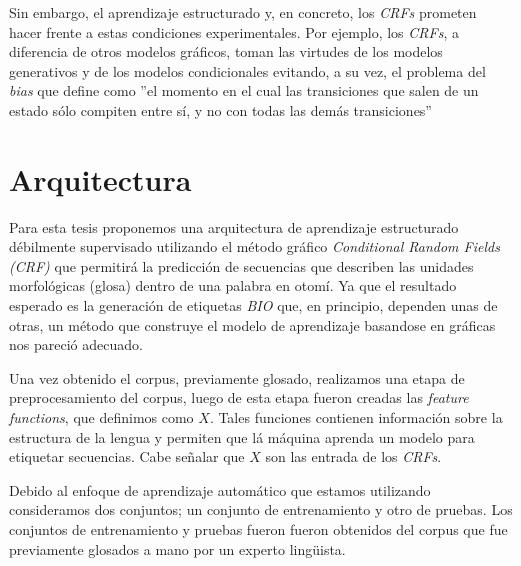 \documentclass[letterpaper,12pt,oneside]{book}
\newcommand{\note}[4][]{\todo[author=#2,color=#3,size=\scriptsize,fancyline,caption={},#1]{#4}} %
\newcommand{\diego}[2][]{\note[#1]{Diego}{blue!40}{#2}}
\newcommand{\Diego}[2][]{\diego[inline,#1]{#2}\noindent}
\theoremstyle{definition}
\begin{document}
Sin  embargo, el aprendizaje estructurado y, en concreto, los \textit{CRFs} prometen hacer frente a estas condiciones experimentales. Por ejemplo, los \textit{CRFs}, a diferencia de otros modelos gráficos, toman las virtudes de los modelos generativos y de los modelos condicionales evitando, a su vez, el problema del \textit{bias} que \citet{lafferty2001conditional} define como  ''el momento en el cual las transiciones que salen de un estado sólo compiten entre sí, y no con todas las demás transiciones'' 

\section{Arquitectura}


Para esta tesis proponemos una arquitectura de aprendizaje estructurado débilmente supervisado utilizando el método gráfico \textit{Conditional Random Fields (CRF)} que permitirá la predicción de secuencias que describen las unidades morfológicas (glosa) dentro de una palabra en otomí. Ya que el resultado esperado es la generación de etiquetas \textit{BIO} que, en principio, dependen unas de otras, un método que construye el modelo de aprendizaje basandose en gráficas nos pareció adecuado.

Una vez obtenido el corpus, previamente glosado, realizamos una etapa de preprocesamiento del corpus, luego de esta etapa fueron creadas las \textit{feature functions}, que definimos como $X$. Tales funciones contienen información sobre la estructura de la lengua y permiten que lá máquina aprenda un modelo para etiquetar secuencias. Cabe señalar que $X$ son las entrada de los \textit{CRFs}.

Debido al enfoque de aprendizaje automático que estamos utilizando consideramos dos conjuntos; un conjunto de entrenamiento y otro de pruebas. Los conjuntos de entrenamiento y pruebas fueron fueron obtenidos del corpus que fue previamente glosados a mano por un experto lingüista.
\end{document}
